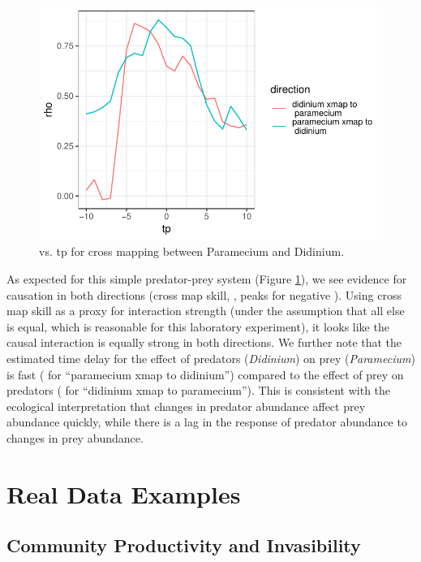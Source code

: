 \documentclass[article]{jss}
\begin{document}
\begin{figure}[t!]
\begin{center}
\includegraphics[width=5in]{article-ccm-time-delays}
\end{center}
\caption{\label{fig:ccm-time-delays}  vs. tp for cross mapping between Paramecium and Didinium.}
\end{figure}

As expected for this simple predator-prey system (Figure \ref{fig:ccm-time-delays}), we see evidence for causation in both directions (cross map skill, , peaks for negative ). Using cross map skill as a proxy for interaction strength (under the assumption that all else is equal, which is reasonable for this laboratory experiment), it looks like the causal interaction is equally strong in both directions. We further note that the estimated time delay for the effect of predators (\emph{Didinium}) on prey (\emph{Paramecium}) is fast ( for ``paramecium xmap to didinium'') compared to the effect of prey on predators ( for ``didinium xmap to paramecium''). This is consistent with the ecological interpretation that changes in predator abundance affect prey abundance quickly, while there is a lag in the response of predator abundance to changes in prey abundance.

\section{Real Data Examples}\label{sec:real-data-examples}

\subsection{Community Productivity and Invasibility}\label{sec:e120}
\end{document}
